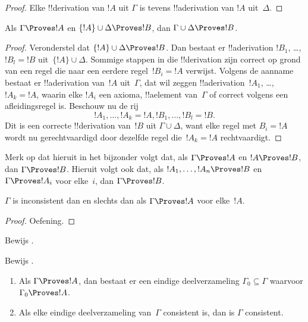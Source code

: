 \documentclass[../../../include/open-logic-section]{subfiles}
\begin{document}
\begin{proof}
Elke !!{derivation} van $!A$ uit $\Gamma$ is tevens !!a{derivation}
van $!A$ uit~$\Delta$.
\end{proof}

\begin{prop}[Transitiviteit]
Als $\Gamma \Proves !A$ en $\{!A\} \cup \Delta \Proves
!B$, dan $\Gamma \cup \Delta \Proves !B$.
\end{prop}

\begin{proof}
  Veronderstel dat $\{!A\} \cup \Delta \Proves !B$. Dan bestaat er
  !!a{derivation} $!B_1$, \dots, $!B_l = !B$ uit~$\{!A\} \cup
  \Delta$. Sommige stappen in die !!{derivation} zijn correct op
  grond van een regel die naar een eerdere regel~$!B_i = !A$
  verwijst. Volgens de aanname bestaat er !!a{derivation} van~$!A$
  uit~$\Gamma$, dat wil zeggen !!a{derivation}~$!A_1$, \dots,
  $!A_k = !A$, waarin elke $!A_i$ een axioma, !!a{element}
  van~$\Gamma$ of correct volgens een afleidingsregel is. Beschouw nu
  de rij
  \[
  !A_1, \dots, !A_k = !A, !B_1, \dots, !B_l = !B.
  \]
  Dit is een correcte !!{derivation} van~$!B$ uit $\Gamma \cup
  \Delta$, want elke regel met $B_i = !A$ wordt nu gerechtvaardigd
  door dezelfde regel die~$!A_k = !A$ rechtvaardigt.
\end{proof}

Merk op dat hieruit in het bijzonder volgt dat, als $\Gamma \Proves
!A$ en $!A \Proves !B$, dan $\Gamma \Proves !B$. Hieruit volgt ook
dat, als $!A_1, \dots, !A_n \Proves !B$ en $\Gamma \Proves !A_i$
voor elke~$i$, dan $\Gamma \Proves !B$.

\begin{prop}
$\Gamma$ is inconsistent dan en slechts dan als $\Gamma \Proves !A$
voor elke~$!A$.
\end{prop}

\begin{proof}
Oefening.
\end{proof}

\begin{prob}
Bewijs .
\end{prob}
\tagendprob

\begin{prob}
Bewijs .
\end{prob}
\tagendprob

\begin{prop}[Compactheid]
  \begin{enumerate}
  \item Als $\Gamma \Proves !A$, dan bestaat er een eindige
    deelverzameling $\Gamma_0 \subseteq \Gamma$ waarvoor
    $\Gamma_0 \Proves !A$.
  \item Als elke eindige deelverzameling van~$\Gamma$ consistent is,
    dan is $\Gamma$ consistent.
  \end{enumerate}
\end{prop}
\end{document}

